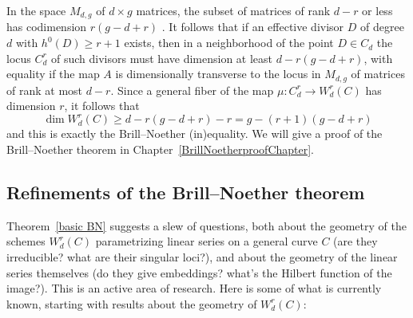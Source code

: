 In the space $M_{d,g}$ of $d \times g$ matrices, the subset of matrices
of rank $d-r$ or less has codimension $r(g-d+r)$
\cite[Exercise 10.9]{Eisenbud1995}.
It follows
that if  an effective divisor $D$ of degree $d$ with $h^0(D) \geq r+1$
exists, then in a neighborhood of the point $D \in C_d$ the locus
$C^r_d$ of such divisors must have dimension at least $d - r(g-d+r)$,
with equality if the map $A$ is dimensionally transverse to the locus
in $M_{d,g}$ of matrices of rank at most $d-r$. Since a general fiber
%
%
of the map $\mu :
C^r_d
 \to
W^r_d
(C)$ has dimension $r$, it follows that
$$
\dim W^r_d(C) \geq d - r(g-d+r) - r = g - (r+1)(g-d+r)
$$
and this is exactly the  Brill--Noether (in)equality. We will give a proof
of the Brill--Noether theorem in Chapter~\ref{BrillNoetherproofChapter}.


\subsection{Refinements of the Brill--Noether theorem}

Theorem~\ref{basic BN} suggests a slew of questions, both about the
geometry of the schemes $W^r_d(C)$ param\-etrizing linear series on a
general curve $C$ (are they irreducible? what are their singular
loci?), and about the geometry of the linear series themselves (do
they give embeddings? what's the Hilbert function of the image?). This
is an active area of research. Here is some of what is currently
known, starting with results about the geometry of $W^r_d(C)$:

